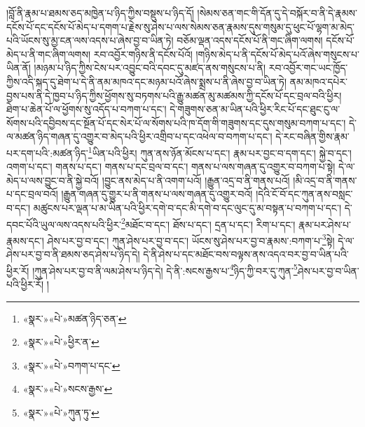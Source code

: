 །བློ་ནི་རྣམ་པ་ཐམས་ཅད་མཁྱེན་པ་ཉིད་ཀྱིས་བསྡུས་པ་ཉིད་དོ། །སེམས་ཅན་གང་གི་དོན་དུ་དེ་བསྐོར་བ་ནི་དེ་རྣམས་དངོས་པོ་དང་དངོས་པོ་མེད་པ་དགག་པ་རྗེས་སུ་ཤེས་པ་ལས་སེམས་ཅན་རྣམས་དུས་གསུམ་དུ་ཕུང་པོ་ལྷག་མ་མེད་པའི་ཡོངས་སུ་མྱ་ངན་ལས་འདས་པ་ཞེས་བྱ་བ་ཡིན་ཏེ། བཅོམ་ལྡན་འདས་དངོས་པོ་ནི་གང་ཞིག་ལགས། དངོས་པོ་མེད་པ་ནི་གང་ཞིག་ལགས། རབ་འབྱོར་གཉིས་ནི་དངོས་པོའོ། །གཉིས་མེད་པ་ནི་དངོས་པོ་མེད་པའོ་ཞེས་གསུངས་པ་ཡིན་ནོ། །མཉམ་པ་ཉིད་ཀྱིས་ངེས་པར་འབྱུང་བའི་དབང་དུ་མཛད་ནས་གསུངས་པ་ནི། རབ་འབྱོར་གང་ཡང་ཁྱོད་ཀྱིས་འདི་སྐད་དུ་ཐེག་པ་དེ་ནི་ནམ་མཁའ་དང་མཉམ་པའོ་ཞེས་སྨྲས་པ་ནི་ཞེས་བྱ་བ་ཡིན་ཏེ། ནམ་མཁའ་དཔེར་བྱས་པས་ནི་དེ་ཁྱབ་པ་ཉིད་ཀྱིས་ཕྱོགས་སུ་བཏགས་པའི་རྒྱུ་མཚན་མུ་མཚམས་ཀྱི་དངོས་པོ་དང་བྲལ་བའི་ཕྱིར། ཐེག་པ་ཆེན་པོ་ལ་ཕྱོགས་སུ་འདོད་པ་བཀག་པ་དང་། དེ་གཟུགས་ཅན་མ་ཡིན་པའི་ཕྱིར་རིང་པོ་དང་ཐུང་ངུ་ལ་སོགས་པའི་དབྱིབས་དང་སྔོན་པོ་དང་སེར་པོ་ལ་སོགས་པའི་ཁ་དོག་གི་གཟུགས་དང་དུས་གསུམ་བཀག་པ་དང་། དེ་ལ་མཚན་ཉིད་གཞན་དུ་འགྱུར་བ་མེད་པའི་ཕྱིར་འགྲིབ་པ་དང་འཕེལ་བ་བཀག་པ་དང་། དེ་རང་བཞིན་གྱིས་རྣམ་པར་དག་པའི་:མཚན་ཉིད་\footnote{«སྣར་»«པེ་»མཚན་ཉིད་ཅན་}ཡིན་པའི་ཕྱིར། ཀུན་ནས་ཉོན་མོངས་པ་དང་། རྣམ་པར་བྱང་བ་དག་དང་། སྐྱེ་བ་དང་། འགག་པ་དང་། གནས་པ་དང་། གནས་པ་དང་བྲལ་བ་དང་། གནས་པ་ལས་གཞན་དུ་འགྱུར་བ་བཀག་པ་སྟེ། དེ་ལ་མེད་པ་ལས་བྱུང་བ་ནི་སྐྱེ་བའོ། །བྱུང་ནས་མེད་པ་ནི་འགག་པའོ། །རྒྱུན་འདྲ་བ་ནི་གནས་པའོ། །མི་འདྲ་བ་ནི་གནས་པ་དང་བྲལ་བའོ། །རྒྱུན་གཞན་དུ་གྱུར་པ་ནི་གནས་པ་ལས་གཞན་དུ་འགྱུར་བའོ། །དེའི་ངོ་བོ་དང་ཀུན་ནས་བསླང་བ་དང་། མཚུངས་པར་ལྡན་པ་མ་ཡིན་པའི་ཕྱིར་དགེ་བ་དང་མི་དགེ་བ་དང་ལུང་དུ་མ་བསྟན་པ་བཀག་པ་དང་། དེ་དབང་པོའི་ཡུལ་ལས་འདས་པའི་ཕྱིར་\footnote{«སྣར་»«པེ་»ཕྱིར་ན་}མཐོང་བ་དང་། ཐོས་པ་དང་། དྲན་པ་དང་། རིག་པ་དང་། རྣམ་པར་ཤེས་པ་རྣམས་དང་། ཤེས་པར་བྱ་བ་དང་། ཀུན་ཤེས་པར་བྱ་བ་དང་། ཡོངས་སུ་ཤེས་པར་བྱ་བ་རྣམས་:བཀག་པ་\footnote{«སྣར་»«པེ་»བཀག་པ་དང་}སྟེ། དེ་ལ་ཤེས་པར་བྱ་བ་ནི་ཐམས་ཅད་ཤེས་པ་ཉིད་དེ། དེ་ནི་ཤེས་པ་དང་མཐོང་བས་བལྟས་ནས་འདའ་བར་བྱ་བ་ཡིན་པའི་ཕྱིར་རོ། །ཀུན་ཤེས་པར་བྱ་བ་ནི་ལམ་ཤེས་པ་ཉིད་དེ། དེ་ནི་:སངས་རྒྱས་པ་\footnote{«སྣར་»«པེ་»སངས་རྒྱས་}ཉིད་ཀྱི་བར་དུ་ཀུན་\footnote{«སྣར་»«པེ་»ཀུན་ཏུ་}ཤེས་པར་བྱ་བ་ཡིན་པའི་ཕྱིར་རོ། །
